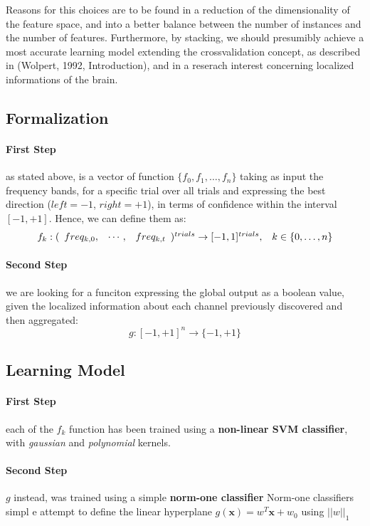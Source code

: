 \documentclass[10pt]{article}
\begin{document}
Reasons for this choices are to be found in a reduction of the dimensionality of the feature space, and into a better balance between the number of instances and the number of features.
Furthermore, by stacking, we should presumibly
achieve a most accurate learning model extending the crossvalidation concept, as described in (Wolpert, 1992, Introduction)\cite{Wolpert92}, and in a reserach interest concerning localized informations of the brain.


\subsection{Formalization} 

\paragraph{First Step} as stated above, is a vector of function 
$ \{f_0, f_1, \dots, f_n \}$ 
taking as input the frequency bands, for a specific trial over all trials and expressing the best direction ($left=-1$, $right=+1$), in terms of confidence within the interval $[-1, +1]$. Hence, we can define them as:
$$
\begin{array}{lr}
f_k: (\begin{array}{l l l} freq_{k, 0}, & \cdots, & freq_{k, t} \end{array})^{trials} \to [-1, 1]^{trials},
&
k \in \{0, \dots, n\}
\end{array}
$$ 

\paragraph{Second Step} we are looking for a funciton expressing the global output as a boolean value, given the localized information about each channel previously discovered and then aggregated:
$$
g: [-1, +1]^n \to \{-1, +1\}
$$


\subsection{Learning Model}

\paragraph{First Step} each of the ${f_k}$ function has been trained using a \textbf{non-linear SVM classifier}, with \emph{gaussian} and \emph{polynomial} kernels. 

\paragraph{Second Step} $g$ instead, was trained using a simple \textbf{norm-one classifier}
Norm-one classifiers simpl
e attempt to define the linear hyperplane 
$g(\boldsymbol{x}) = w^T\boldsymbol{x} + w_0$ using $||w||_1$
\end{document}
